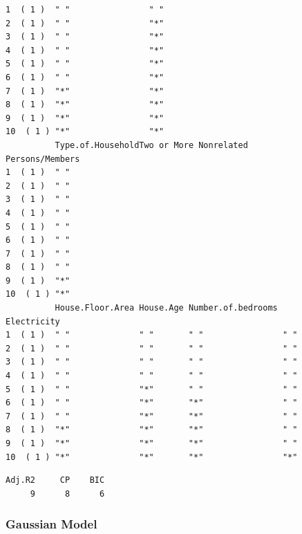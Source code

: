 \documentclass[
]{article}
\begin{document}
\begin{figure}[H]
\begin{verbatim}
1  ( 1 )  " "                " "                           
2  ( 1 )  " "                "*"                           
3  ( 1 )  " "                "*"                           
4  ( 1 )  " "                "*"                           
5  ( 1 )  " "                "*"                           
6  ( 1 )  " "                "*"                           
7  ( 1 )  "*"                "*"                           
8  ( 1 )  "*"                "*"                           
9  ( 1 )  "*"                "*"                           
10  ( 1 ) "*"                "*"                           
          Type.of.HouseholdTwo or More Nonrelated Persons/Members
1  ( 1 )  " "                                                    
2  ( 1 )  " "                                                    
3  ( 1 )  " "                                                    
4  ( 1 )  " "                                                    
5  ( 1 )  " "                                                    
6  ( 1 )  " "                                                    
7  ( 1 )  " "                                                    
8  ( 1 )  " "                                                    
9  ( 1 )  "*"                                                    
10  ( 1 ) "*"                                                    
          House.Floor.Area House.Age Number.of.bedrooms Electricity
1  ( 1 )  " "              " "       " "                " "        
2  ( 1 )  " "              " "       " "                " "        
3  ( 1 )  " "              " "       " "                " "        
4  ( 1 )  " "              " "       " "                " "        
5  ( 1 )  " "              "*"       " "                " "        
6  ( 1 )  " "              "*"       "*"                " "        
7  ( 1 )  " "              "*"       "*"                " "        
8  ( 1 )  "*"              "*"       "*"                " "        
9  ( 1 )  "*"              "*"       "*"                " "        
10  ( 1 ) "*"              "*"       "*"                "*"        
\end{verbatim}

\begin{verbatim}
Adj.R2     CP    BIC 
     9      8      6 
\end{verbatim}

\hypertarget{gaussian-model}{%
\subsubsection{Gaussian Model}\label{gaussian-model}}


\end{figure}
\end{document}

